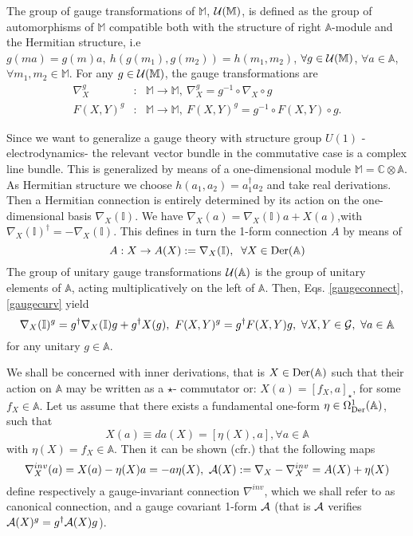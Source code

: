 \documentclass[a4paper,11pt]{article}
\numberwithin{equation}{section}
\def\gC{{\mathbb C}}
\newcommand\algebA{{\mathbb A}}
\newcommand\modul{{\mathbb M}}
\newcommand\calg{{{\cal{G}}}}
\newcommand\DER{{\text{\textup{Der}}}}
\theoremstyle{nonumberplain}
\begin{document}
The group of gauge transformations   of $\modul$, ${\cal{U}}(\modul)$, is   defined \cite{Wallet:2008bq} as the group of automorphisms of $\modul$ compatible both with the structure of right $\algebA$-module and the Hermitian structure, i.e $g(ma)=g(m)a,\ h(g(m_1),g(m_2))=h(m_1,m_2)$, $\forall g\in{\cal{U}}(\modul)$, $\forall a\in\algebA$, $\forall m_1,m_2\in\modul$. For any $g\in{\cal{U}}(\modul)$, the gauge transformations are
\begin{eqnarray}
{\nabla}^g_X&:&\modul\to\modul,\ {\nabla}^g_X = g^{-1}\circ {\nabla}_X \circ g\label{gaugeconnect}\\
F(X,Y)^g&:&\modul\to\modul,\ F(X,Y)^g=g^{-1}\circ F(X,Y) \circ g\label{gaugecurv}.
\end{eqnarray}

Since we want to generalize a gauge theory with structure  group  $U(1)$ -electrodynamics-  the relevant vector bundle in the commutative case  is a complex line bundle. This is generalized by means of a one-dimensional module $\modul=\gC \otimes \algebA$. As Hermitian structure  we choose $h(a_1,a_2)=a_1^\dag a_2$ and take real derivations. Then a Hermitian connection is entirely determined \cite{Wallet:2008bq} by its action on the one-dimensional basis $\nabla_X({\mathbb{I}})$. We have  $ \nabla_X(a)= \nabla_X({\mathbb{I}}) a + X(a)$,with  $\nabla_X({\mathbb{I}})^\dag=-\nabla_X({\mathbb{I}})$. This defines in turn the 1-form connection $A$  by  means of 
\begin{equation}
A:X\to A(X):=\nabla_X({\mathbb{I}}), \;\; \forall X\in\DER(\algebA)
\end{equation}
 The group of unitary gauge transformations ${\cal{U}}(\algebA)$ is the group of unitary elements of $\algebA$, acting multiplicatively on the left of $\algebA$. Then,  Eqs. \eqref{gaugeconnect}, \eqref{gaugecurv} yield
\begin{equation}
\nabla_X({\mathbb{I}})^g=g^\dag\nabla_X({\mathbb{I}})g+g^\dag X(g),\ F(X,Y)^g=g^\dag F(X,Y)g,\ \forall X, Y\in\calg,\ \forall a\in\algebA\label{gaugetransfinal}
\end{equation}
for any unitary $g\in\algebA$. \par 

We shall be concerned with inner derivations, that is $X\in \DER(\algebA)$ such that their action on $\algebA$ may be written as a $\star$-
commutator or: $X( a)= [f_X, a]_\star$, for some $f_X\in \algebA$. Let us assume that there exists a fundamental one-form $\eta\in \Omega^1_{\DER}(\algebA)$, such that  
\begin{equation}
X(a)\equiv da (X)= [\eta(X),a], \forall a\in \algebA \label{etaX}
\end{equation}
 with  $\eta(X)= f_X\in \algebA$. Then it can be shown (cfr.\cite{Wallet:2008bq}) that the following maps
\begin{equation}
  \nabla^{inv}_X(a)=X(a)-\eta(X) a=-a\eta(X),\ {\cal{A}}(X):=\nabla_X-\nabla^{inv}_X=A(X)+\eta(X)\label{canonics}
\end{equation}
define respectively a gauge-invariant connection $\nabla^{inv}$,  which we shall refer to as canonical connection,  and a gauge covariant 1-form ${\cal{A}}$ (that is  $\cal{A}$  verifies ${\cal{A}}(X) ^g=g^\dag{\cal{A}}(X)g$). 
\end{document}
